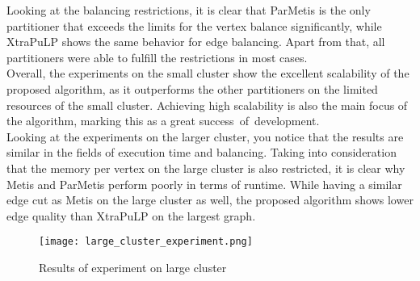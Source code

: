 \documentclass[acmsmall,nonacm,screen,review]{acmart}
\begin{document}
Looking at the balancing restrictions, it is clear that ParMetis is the only partitioner that exceeds the limits for the vertex balance significantly, while XtraPuLP shows the same behavior for edge balancing. Apart from that, all partitioners were able to fulfill the restrictions in most cases. \\
Overall, the experiments on the small cluster show the excellent scalability of the proposed algorithm, as it outperforms the other partitioners on the limited resources of the small cluster. Achieving high scalability is also the main focus of the algorithm, marking this as a great \hbox{success of development.} \\
Looking at the experiments on the larger cluster, you notice that the results are similar in the fields of execution time and balancing. Taking into consideration that the memory per vertex on the large cluster is also restricted, it is clear why Metis and ParMetis perform poorly in terms of runtime. While having a similar edge cut as Metis on the large cluster as well, the proposed algorithm shows lower edge quality than XtraPuLP on the largest graph.
\begin{figure}[bt!]
\centering
\caption{Results of experiment on large cluster}
\label{large_ex}
\texttt{[image: large\_cluster\_experiment.png]}
\end{figure}
\end{document}

